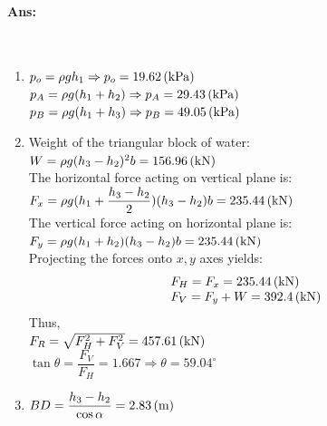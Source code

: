 \paragraph{Ans:}$  $\\
\begin{enumerate}
	\item $ p_o = \rho g h_1\Rightarrow p_o=19.62\, (\mathrm{kPa}) $\\
	$ p_A = \rho g (h_1+h_2)\Rightarrow p_A=29.43\, (\mathrm{kPa})$\\
	$ p_B = \rho g (h_1+h_3)\Rightarrow p_B=49.05\, (\mathrm{kPa})$
	\item Weight of the triangular block of water:\\
	$ W=\rho g (h_3-h_2)^2b= 156.96\, (\mathrm{kN})$\\
	The horizontal force acting on vertical plane is:\\
	$ F_x = \rho g (h_1+\dfrac{h_3-h_2}{2})(h_3-h_2)b =235.44\, (\mathrm{kN})$\\
	The vertical force acting on horizontal plane is:\\
	$ F_y = \rho g (h_1+h_2)(h_3-h_2)b=235.44\, (\mathrm{kN}) $\\
	Projecting the forces onto $ x,y $ axes yields:
	\[\begin{array}{l}
	F_H=F_x=235.44\, (\mathrm{kN})
	\\
	F_V=F_y+W=392.4\, (\mathrm{kN})
	\end{array}\]
	Thus, \\
	$ F_R=\sqrt{F_H^2+F_V^2}=457.61\, (\mathrm{kN})	$\\
	$ \tan\theta=\dfrac{F_V}{F_H}=1.667\Rightarrow\theta=59.04^\circ $
	\item $ BD = \dfrac{h_3-h_2}{\cos\alpha} =2.83\, (\mathrm{m}) $
\end{enumerate}

